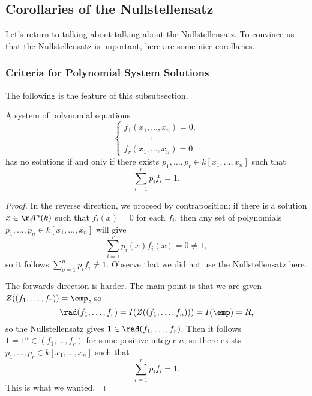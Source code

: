 \subsection{Corollaries of the Nullstellensatz}
Let's return to talking about talking about the Nullstellensatz. To convince us that the Nullstellensatz is important, here are some nice corollaries.

\subsubsection{Criteria for Polynomial System Solutions}
The following is the feature of this subsubsection.
\begin{corollary}
	A system of polynomial equations
	\[\begin{cases}
		f_1(x_1,\ldots,x_n) = 0, \\
		\qquad\quad~\vdots \\
		f_r(x_1,\ldots,x_n) = 0,
	\end{cases}\]
	has no solutions if and only if there exists $p_1,\ldots,p_r\in k[x_1,\ldots,x_n]$ such that
	\[\sum_{i=1}^rp_if_i=1.\]
\end{corollary}
\begin{proof}
	In the reverse direction, we proceed by contraposition: if there is a solution $x\in\AA^n(k)$ such that $f_i(x)=0$ for each $f_i$, then any set of polynomials $p_1,\ldots,p_n\in k[x_1,\ldots,x_n]$ will give
	\[\sum_{i=1}^rp_i(x)f_i(x)=0\ne1,\]
	so it follows $\sum_{o=1}^np_if_i\ne1$. Observe that we did not use the Nullstellensatz here.

	The forwards direction is harder. The main point is that we are given $Z((f_1,\ldots,f_r))=\emp$, so
	\[\rad(f_1,\ldots,f_r)=I(Z((f_1,\ldots,f_n)))=I(\emp)=R,\]
	so the Nullstellensatz gives $1\in\rad(f_1,\ldots,f_r)$. Then it follows $1=1^n\in(f_1,\ldots,f_r)$ for some positive integer $n$, so there exists $p_1,\ldots,p_r\in k[x_1,\ldots,x_n]$ such that
	\[\sum_{i=1}^rp_if_i=1.\]
	This is what we wanted.
\end{proof}


